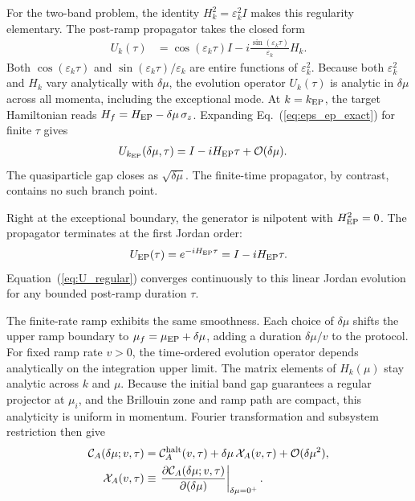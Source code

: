 \documentclass[aps,prb,reprint,superscriptaddress,amsmath,amssymb,floatfix]{revtex4-2}
\begin{document}
For the two-band problem, the identity $H_k^2=\varepsilon_k^2 I$ makes this regularity elementary. The post-ramp propagator takes the closed form
\begin{equation}
\begin{aligned}
U_k(\tau) &= \cos(\varepsilon_k\tau)I -i\frac{\sin(\varepsilon_k\tau)}{\varepsilon_k}H_k .
\end{aligned} \label{eq:exact_propagator}
\end{equation}
Both $\cos(\varepsilon_k\tau)$ and $\sin(\varepsilon_k\tau)/\varepsilon_k$ are entire functions of $\varepsilon_k^2$. Because both $\varepsilon_k^2$ and $H_k$ vary analytically with $\delta\mu$, the evolution operator $U_k(\tau)$ is analytic in $\delta\mu$ across all momenta, including the exceptional mode. At $k=k_{\rm EP}$, the target Hamiltonian reads $H_f=H_{\rm EP}-\delta\mu\,\sigma_z$. Expanding Eq.~(\ref{eq:eps_ep_exact}) for finite $\tau$ gives
\begin{equation}
\begin{aligned}
U_{k_{\rm EP}}(\delta\mu,\tau) &= I-iH_{\rm EP}\tau +\mathcal O(\delta\mu).
\end{aligned} \label{eq:U_regular}
\end{equation}
The quasiparticle gap closes as $\sqrt{\delta\mu}$. The finite-time propagator, by contrast, contains no such branch point.

  Right at the exceptional boundary, the generator is nilpotent with $H_{\rm EP}^2=0$. The propagator terminates at the first Jordan order:
\begin{equation}
U_{\rm EP}(\tau) = e^{-iH_{\rm EP}\tau} = I-iH_{\rm EP}\tau .
\label{eq:Jordan_U}
\end{equation}
Equation~(\ref{eq:U_regular}) converges continuously to this linear Jordan evolution for any bounded post-ramp duration $\tau$.

The finite-rate ramp exhibits the same smoothness. Each choice of $\delta\mu$ shifts the upper ramp boundary to $\mu_f=\mu_{\rm EP}+\delta\mu$, adding a duration $\delta\mu/v$ to the protocol. For fixed ramp rate $v>0$, the time-ordered evolution operator depends analytically on the integration upper limit. The matrix elements of $H_k(\mu)$ stay analytic across $k$ and $\mu$. Because the initial band gap guarantees a regular projector at $\mu_i$, and the Brillouin zone and ramp path are compact, this analyticity is uniform in momentum. Fourier transformation and subsystem restriction then give
\begin{equation}
\begin{aligned}
\mathcal C_A(\delta\mu;v,\tau) &= \mathcal C_A^{\rm halt}(v,\tau) + \delta\mu\,\mathcal X_A(v,\tau) + \mathcal O(\delta\mu^2), \\ \mathcal X_A(v,\tau) &\equiv \left. \frac{\partial\mathcal C_A(\delta\mu;v,\tau)} {\partial(\delta\mu)} \right|_{\delta\mu=0^+}.
\end{aligned} \label{eq:CA_linear_endpoint}
\end{equation}
\end{document}
